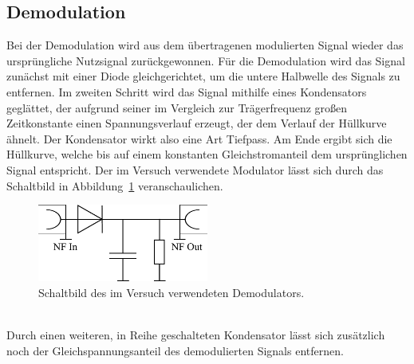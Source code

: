 \documentclass[a4paper,twoside,final]{article}
\begin{document}
\subsection{Demodulation}
Bei der Demodulation wird aus dem übertragenen modulierten Signal wieder das ursprüngliche Nutzsignal zurückgewonnen. Für die Demodulation wird das Signal zunächst mit einer Diode gleichgerichtet, um die untere Halbwelle des Signals zu entfernen. Im zweiten Schritt wird das Signal mithilfe eines Kondensators geglättet, der aufgrund seiner im Vergleich zur Trägerfrequenz großen Zeitkonstante einen Spannungsverlauf erzeugt, der dem Verlauf der Hüllkurve ähnelt. Der Kondensator wirkt also eine Art Tiefpass. Am Ende ergibt sich die Hüllkurve, welche bis auf einem konstanten Gleichstromanteil dem ursprünglichen Signal entspricht. Der im Versuch verwendete Modulator lässt sich durch das Schaltbild in Abbildung~\ref{fig:Demodulator} veranschaulichen.
\begin{figure}[htp]
    \centering
    \includegraphics[width=0.5\textwidth]{Schaltungen/Demodulator.pdf}
    \caption{Schaltbild des im Versuch verwendeten Demodulators.}
    \label{fig:Demodulator}
\end{figure}\\
Durch einen weiteren, in Reihe geschalteten Kondensator lässt sich zusätzlich noch der Gleichspannungsanteil des demodulierten Signals entfernen.
\end{document}
